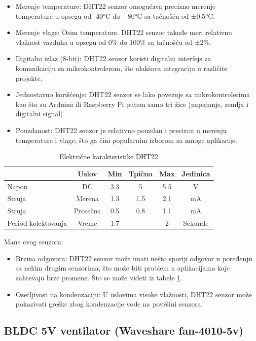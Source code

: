 \documentclass[a4paper, 12pt]{article}
\begin{document}
\begin{itemize}
	\item Merenje temperature: DHT22 senzor omogućava precizno merenje temperature u opsegu od -40°C do +80°C sa tačnošću od ±0.5°C.
	\item Merenje vlage: Osim temperature, DHT22 senzor takođe meri relativnu vlažnost vazduha u opsegu od 0\% do 100\% sa tačnošću od ±2\%.
	\item Digitalni izlaz (8-bit): DHT22 senzor koristi digitalni interfejs za komunikaciju sa mikrokontrolerom, što olakšava integraciju u različite projekte.
	\item Jednostavno korišćenje: DHT22 senzor se lako povezuje sa mikrokontrolerima kao što su Arduino ili Raspberry Pi putem samo tri žice (napajanje, zemlja i digitalni signal).
	\item Pouzdanost: DHT22 senzor je relativno pouzdan i precizan u merenju temperature i vlage, što ga čini popularnim izborom za mnoge aplikacije.
\end{itemize}

\begin{table}[H]
\centering
\begin{tabular}{|l|c|c|c|c|c|}
\hline
& Uslov & Min & Tpično & Max & Jedinica\\
\hline
Napon & DC & 3.3 & 5 & 5.5 & V\\
\hline
Struja & Merena & 1.3 & 1.5 & 2.1 & mA\\
\hline
Struja & Prosečna & 0.5 & 0.8 & 1.1 & mA\\
\hline
Period kolektovanja & Vreme & 1.7 &  & 2 & Sekunde\\
\hline
\end{tabular}
\caption{Električne karakteristike DHT22} \label{ref:tabela-2}
\end{table}

Mane ovog senzora: 
\begin{itemize}
\item Brzina odgovora: DHT22 senzor može imati nešto sporiji odgovor u poređenju sa nekim drugim senzorima, što može biti problem u aplikacijama koje zahtevaju brze promene. Što se može videti iz tabele \ref{ref:tabela-2}.
\item Osetljivost na kondenzaciju: U uslovima visoke vlažnosti, DHT22 senzor može pokazivati greške zbog kondenzacije vode na površini senzora.
\end{itemize}

\pagebreak

	\subsection{BLDC 5V ventilator (Waveshare fan-4010-5v)}
	
\end{document}
